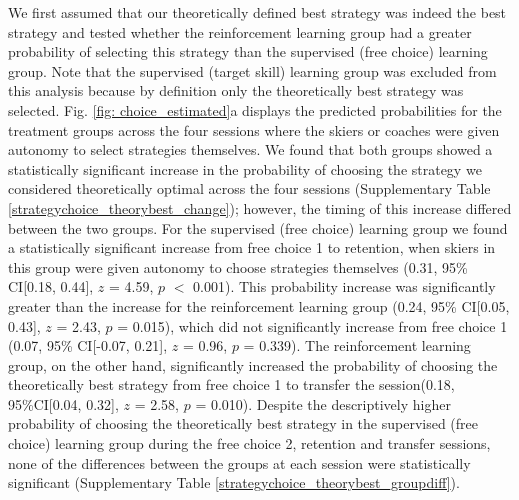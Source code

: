 \documentclass[pdflatex,sn-mathphys-num]{sn-jnl}%
\theoremstyle{thmstyleone}%
\theoremstyle{thmstyletwo}%
\theoremstyle{thmstylethree}%
\begin{document}
We first assumed that our theoretically defined best strategy was indeed the best strategy and tested whether the reinforcement learning group had a greater probability of selecting this strategy than the supervised (free choice) learning group. Note that the supervised (target skill) learning group was excluded from this analysis because by definition only the theoretically best strategy was selected. Fig. \ref{fig: choice_estimated}a displays the predicted probabilities for the treatment groups across the four sessions where the skiers or coaches were given autonomy to select strategies themselves. We found that both groups showed a statistically significant increase in the probability of choosing the strategy we considered theoretically optimal across the four sessions (Supplementary Table \ref{strategychoice_theorybest_change}); however, the timing of this increase differed between the two groups. For the supervised (free choice) learning group we found a statistically significant increase from free choice 1 to retention, when skiers in this group were given autonomy to choose strategies themselves (0.31, 95\% CI[0.18, 0.44], $z$ = 4.59, $p$ $<$ 0.001). This probability increase was significantly greater than the increase for the reinforcement learning group (0.24, 95\% CI[0.05, 0.43], $z$ = 2.43, $p$ = 0.015), which did not significantly increase from free choice 1 (0.07, 95\% CI[-0.07, 0.21], $z$ = 0.96, $p$ = 0.339). The reinforcement learning group, on the other hand, significantly increased the probability of choosing the theoretically best strategy from free choice 1  to transfer the session(0.18, 95\%CI[0.04, 0.32], $z$ = 2.58, $p$ = 0.010). Despite the descriptively higher probability of choosing the theoretically best strategy in the supervised (free choice) learning group during the free choice 2, retention and transfer sessions, none of the differences between the groups at each session were statistically significant (Supplementary Table \ref{strategychoice_theorybest_groupdiff}). 
\end{document}
